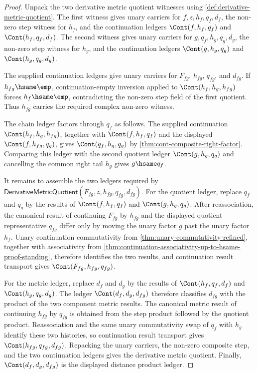 \begin{proof}
Unpack the two derivative metric quotient witnesses using
\autoref{def:derivative-metric-quotient}. The first witness gives unary
carriers for $f,z,h_f,q_f,d_f$, the non-zero step witness for $h_f$, and the
continuation ledgers $\Cont(f,h_f,q_f)$ and $\Cont(h_f,q_f,d_f)$. The second
witness gives unary carriers for $g,q_f,h_g,q_g,d_g$, the non-zero step witness
for $h_g$, and the continuation ledgers $\Cont(g,h_g,q_g)$ and
$\Cont(h_g,q_g,d_g)$.

The supplied continuation ledgers give unary carriers for $F_{fg}$, $h_{fg}$,
$q_{fg}$, and $d_{fg}$. If $h_{fg}\hsame\emp$, continuation-empty inversion
applied to $\Cont(h_f,h_g,h_{fg})$ forces $h_f\hsame\emp$, contradicting the
non-zero step field of the first quotient. Thus $h_{fg}$ carries the required
complex non-zero witness.

The chain ledger factors through $q_f$ as follows. The supplied continuation
$\Cont(h_f,h_g,h_{fg})$, together with $\Cont(f,h_f,q_f)$ and the displayed
$\Cont(f,h_{fg},q_g)$, gives $\Cont(q_f,h_g,q_g)$ by
\autoref{thm:cont-composite-right-factor}. Comparing this ledger with the
second quotient ledger $\Cont(g,h_g,q_g)$ and cancelling the common right tail
$h_g$ gives $g\hsame q_f$.

It remains to assemble the two ledgers required by
$\mathsf{DerivativeMetricQuotient}(F_{fg},z,h_{fg},q_{fg},d_{fg})$. For the
quotient ledger, replace $q_f$ and $q_g$ by the results of
$\Cont(f,h_f,q_f)$ and $\Cont(g,h_g,q_g)$. After reassociation, the canonical
result of continuing $F_{fg}$ by $h_{fg}$ and the displayed quotient
representative $q_{fg}$ differ only by moving the unary factor $g$ past the
unary factor $h_f$. Unary continuation commutativity from
\autoref{thm:unary-commutativity-refined}, together with associativity from
\autoref{thm:continuation-associativity-up-to-hsame-proof-standing}, therefore
identifies the two results, and continuation result transport gives
$\Cont(F_{fg},h_{fg},q_{fg})$.

For the metric ledger, replace $d_f$ and $d_g$ by the results of
$\Cont(h_f,q_f,d_f)$ and $\Cont(h_g,q_g,d_g)$. The ledger
$\Cont(d_f,d_g,d_{fg})$ therefore classifies $d_{fg}$ with the product of the
two component metric results. The canonical metric result of continuing
$h_{fg}$ by $q_{fg}$ is obtained from the step product followed by the quotient
product. Reassociation and the same unary commutativity swap of $q_f$ with
$h_g$ identify these two histories, so continuation result transport gives
$\Cont(h_{fg},q_{fg},d_{fg})$. Repacking the unary carriers, the non-zero
composite step, and the two continuation ledgers gives the derivative metric
quotient. Finally, $\Cont(d_f,d_g,d_{fg})$ is the displayed distance product
ledger.
\end{proof}

